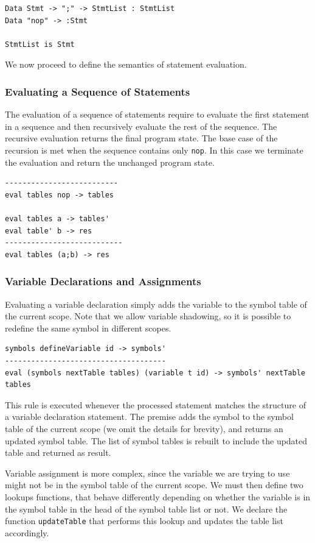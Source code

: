 \begin{lstlisting}
Data Stmt -> ";" -> StmtList : StmtList
Data "nop" -> :Stmt

StmtList is Stmt

\end{lstlisting}

We now proceed to define the semantics of statement evaluation.

\subsubsection{Evaluating a Sequence of Statements}
The evaluation of a sequence of statements require to evaluate the first statement in a sequence and then recursively evaluate the rest of the sequence. The recursive evaluation returns the final program state. The base case of the recursion is met when the sequence contains only \texttt{nop}. In this case we terminate the evaluation and return the unchanged program state.

\begin{lstlisting}
--------------------------
eval tables nop -> tables

eval tables a -> tables'
eval table' b -> res
---------------------------
eval tables (a;b) -> res
\end{lstlisting}

\subsubsection{Variable Declarations and Assignments}
Evaluating a variable declaration simply adds the variable to the symbol table of the current scope. Note that we allow variable shadowing, so it is possible to redefine the same symbol in different scopes.

\begin{lstlisting}
symbols defineVariable id -> symbols'
-------------------------------------
eval (symbols nextTable tables) (variable t id) -> symbols' nextTable tables
\end{lstlisting}

\noindent
This rule is executed whenever the processed statement matches the structure of a variable declaration statement. The premise adds the symbol to the symbol table of the current scope (we omit the details for brevity), and returns an updated symbol table. The list of symbol 
tables is rebuilt to include the updated table and returned as result.

Variable assignment is more complex, since the variable we are trying to use might not be in the symbol table of the current scope. We must then define two lookups functions, that behave differently depending on whether the variable is in the symbol table in the head of the symbol table list or not. We declare the function \texttt{updateTable} that performs this lookup and updates the table list accordingly. 

